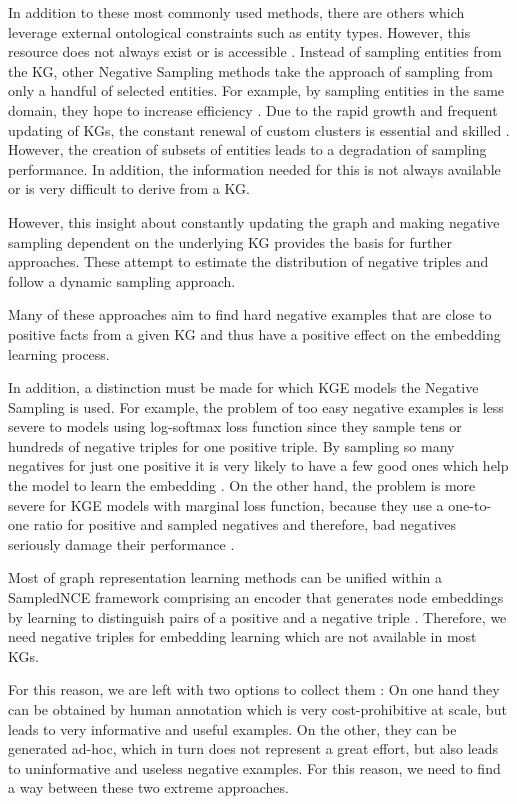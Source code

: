 In addition to these most commonly used methods, there are others which leverage external ontological constraints such as entity types.
However, this resource does not always exist or is accessible \cite{cai2017kbgan}.
Instead of sampling entities from the \ac{KG}, other Negative Sampling methods take the approach of sampling from only a handful of selected entities.
For example, by sampling entities in the same domain, they hope to increase efficiency \cite{qiannegative}.
Due to the rapid growth and frequent updating of \acp{KG}, the constant renewal of custom clusters is essential and skilled \cite{qiannegative}. 
However, the creation of subsets of entities leads to a degradation of sampling performance.
In addition, the information needed for this is not always available or is very difficult to derive from a \ac{KG}.

However, this insight about constantly updating the graph and making negative sampling dependent on the underlying KG provides the basis for further approaches.
These attempt to estimate the distribution of negative triples and follow a dynamic sampling approach. 

Many of these approaches aim to find hard negative examples that are close to positive facts from a given \ac{KG} and thus have a positive effect on the embedding learning process.




In addition, a distinction must be made for which \ac{KGE} models the Negative Sampling is used.
For example, the problem of too easy negative examples is less severe to models using log-softmax loss function since they sample tens or hundreds of negative triples for one positive triple.
By sampling so many negatives for just one positive it is very likely to have a few good ones which help the model to learn the embedding \cite{cai2017kbgan}.
On the other hand, the problem is more severe for KGE models with marginal loss function, because they use a one-to-one ratio for positive and sampled negatives and therefore, bad negatives seriously damage their performance \cite{cai2017kbgan}.







Most of graph representation learning methods can be unified within a \ac{SampledNCE} framework comprising an encoder that generates node embeddings by learning to distinguish pairs of a positive and a negative triple \cite{MCNS}.
Therefore, we need negative triples for embedding learning which are not available in most \acp{KG}. 

For this reason, we are left with two options to collect them \cite{safavi2021negater}: 
On one hand they can be obtained by human annotation which is very cost-prohibitive at scale, but leads to very informative and useful examples. 
On the other, they can be generated ad-hoc, which in turn does not represent a great effort, but also leads to uninformative and useless negative examples.
For this reason, we need to find a way between these two extreme approaches.





